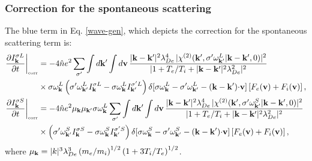 \documentclass[12pt,a4paper,ruledheader]{report}
\begin{document}
\subsubsection{Correction for the spontaneous scattering}
The blue term in Eq. \eqref{wave-gen}, which depicts the
correction for the spontaneous scattering term is:
\begin{equation}
  \label{corrLS}
  \begin{split}
     \frac{\partial I_{\bf k}^{\sigma L}}{\partial t}\biggr|_{\mbox{\tiny corr}}
    &= - 4\hat n e^2 \sum_{\sigma '}  \int d{\bf k'}\int d{\bf v}\,
       \frac{|{\bf k-k'}|^2 \lambda_{De}^4\,
       |\chi^{(2)}({\bf k'},\sigma '\omega_{\bf k'}^L|{\bf k-k'},0)|^2}
    {|1+T_e/T_i+|{\bf k-k'}|^2 \lambda_{De}^2|^2}\\
    &\times \sigma \omega_{\bf k}^L \left( \sigma '\omega_{\bf k'}^L I_{\bf k}^{\sigma L}
      -\sigma \omega_{\bf k}^L I_{\bf k'}^{\sigma 'L}\right) 
    \delta[\sigma\omega_{\bf k}^L-\sigma '\omega_{\bf k'}^L
    -({\bf k-k'}){\bf \cdot v}]\left[ F_e({\bf v}) +F_i({\bf v})\right],\\
     \frac{\partial I_{\bf k}^{\sigma S}}{\partial t}\biggr|_{\mbox{\tiny corr}}
     &= - 4\hat n e^2\mu_{\bf k}\mu_{\bf k'}
     \sigma \omega_{\bf k}^L \sum_{\sigma '}  \int d{\bf k'}\int d{\bf v}\,
       \frac{|{\bf k-k'}|^2 \lambda_{De}^4\,
       |\chi^{(2)}({\bf k'},\sigma '\omega_{\bf k'}^S|{\bf k-k'},0)|^2}
    {|1+T_e/T_i+|{\bf k-k'}|^2 \lambda_{De}^2|^2}\\
    &\times \left( \sigma '\omega_{\bf k'}^S I_{\bf k}^{\sigma S}
      -\sigma \omega_{\bf k}^S I_{\bf k'}^{\sigma 'S}\right)
    \delta[\sigma\omega_{\bf k}^S-\sigma '\omega_{\bf k'}^S
    -({\bf k-k'}){\bf \cdot v}]\left[ F_e({\bf v}) +F_i({\bf v})\right],
  \end{split}
\end{equation}
where $\mu_{\bf k}=|k|^3\lambda_{De}^3 \left(m_e/m_i\right)^{1/2}
\left( 1+3T_i/T_e \right)^{1/2}$.
\end{document}
